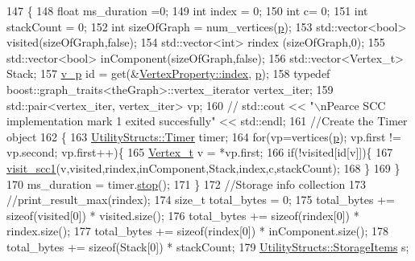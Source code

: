 \begin{DoxyCode}
147                                                  \{
148     \textcolor{keywordtype}{float} ms\_duration =0;
149     \textcolor{keywordtype}{int} index = 0;
150     \textcolor{keywordtype}{int} c= 0;
151     \textcolor{keywordtype}{int} stackCount = 0;
152     \textcolor{keywordtype}{int} sizeOfGraph = num\_vertices(\hyperlink{class_pearce_a2320928312fd97f6bcb1f16684f79a03}{p});
153     std::vector<bool> visited(sizeOfGraph,\textcolor{keyword}{false});
154     std::vector<int> rindex (sizeOfGraph,0);
155     std::vector<bool> inComponent(sizeOfGraph,\textcolor{keyword}{false});
156     std::vector<Vertex\_t> Stack;
157     \hyperlink{utilities_8h_a3f4959b3d837fa6351a9414c79280286}{v\_p} \textcolor{keywordtype}{id} = \textcolor{keyword}{get}(&\hyperlink{struct_utility_structs_1_1_vertex_property_a636cb729438e999aa3d9a17ac39d8641}{VertexProperty::index}, \hyperlink{class_pearce_a2320928312fd97f6bcb1f16684f79a03}{p});
158     \textcolor{keyword}{typedef} boost::graph\_traits<theGraph>::vertex\_iterator vertex\_iter;
159     std::pair<vertex\_iter, vertex\_iter> vp;
160 \textcolor{comment}{//    std::cout << "\(\backslash\)nPearce SCC implementation mark 1 exited succesfully" << std::endl;}
161     \textcolor{comment}{//Create the Timer object}
162     \{
163         \hyperlink{class_utility_structs_1_1_timer}{UtilityStructs::Timer} timer;
164     \textcolor{keywordflow}{for}(vp=vertices(\hyperlink{class_pearce_a2320928312fd97f6bcb1f16684f79a03}{p}); vp.first != vp.second; vp.first++)\{
165         \hyperlink{utilities_8h_a344cd987714d06997f0becda3c96d6e2}{Vertex\_t} v = *vp.first;
166         \textcolor{keywordflow}{if}(!visited[\textcolor{keywordtype}{id}[v]])\{
167             \hyperlink{class_pearce_ae4e9364dd0c829564ecfbfe8ccc07b6a}{visit\_scc1}(v,visited,rindex,inComponent,Stack,index,c,stackCount);
168         \}
169     \}
170     ms\_duration = timer.\hyperlink{class_utility_structs_1_1_timer_a12f62b57c263d563efd6089cff52355f}{stop}();
171     \}
172     \textcolor{comment}{//Storage info collection}
173     \textcolor{comment}{//print\_result\_max(rindex);}
174     \textcolor{keywordtype}{size\_t} total\_bytes = 0;
175     total\_bytes += \textcolor{keyword}{sizeof}(visited[0]) * visited.size();
176     total\_bytes += \textcolor{keyword}{sizeof}(rindex[0]) * rindex.size();
177     total\_bytes += \textcolor{keyword}{sizeof}(rindex[0]) * inComponent.size();
178     total\_bytes += \textcolor{keyword}{sizeof}(Stack[0]) * stackCount;
179     \hyperlink{struct_utility_structs_1_1_storage_items}{UtilityStructs::StorageItems} s;

\end{DoxyCode}
